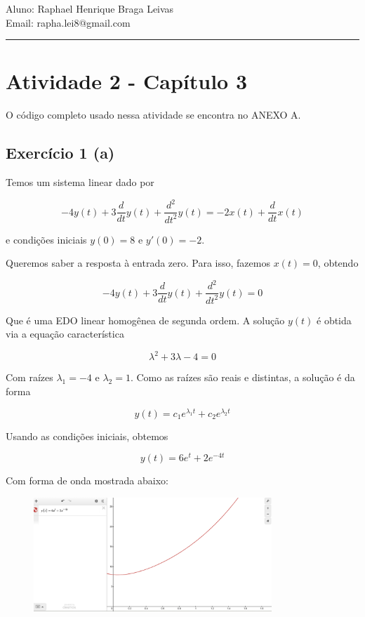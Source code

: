 \documentclass[12pt]{scrartcl}
\makeatletter
\def\today{%
  \two@digits{\the\day}/%
  \ifcase\month\or%
  01\or 02\or 03\or 04\or 05\or 06\or%
  07\or 08\or 09\or 10\or 11\or 12\fi/%
  \number\year%
}
\makeatother
\begin{document}
\pagestyle{fancy}

\fancyhead{}
\fancyhead[R]{Data: \today}
\fancyfoot{}

\begin{center}
    Aluno: Raphael Henrique Braga Leivas \\[20pt]
    Email: rapha.lei8@gmail.com
\end{center}

\hrule

\section*{Atividade 2 - Capítulo 3}

O código completo usado nessa atividade se encontra no ANEXO A.

\subsection*{Exercício 1 (a)}

Temos um sistema linear dado por

\[  - 4 y{\left(t \right)} + 3 \frac{d}{d t} y{\left(t \right)} + \frac{d^{2}}{d t^{2}} y{\left(t \right)} = - 2 x{\left(t \right)} + \frac{d}{d t} x{\left(t \right)} \]

e condições iniciais $y(0) = 8$ e $y'(0) = -2$.

Queremos saber a resposta à entrada zero. Para isso, fazemos $x(t)=0$, obtendo

\[  - 4 y{\left(t \right)} + 3 \frac{d}{d t} y{\left(t \right)} + \frac{d^{2}}{d t^{2}} y{\left(t \right)} =  0 \]

Que é uma EDO linear homogênea de segunda ordem. A solução $y(t)$ é obtida via a equação 
característica

\[ \lambda^{2} + 3 \lambda - 4 = 0 \]

Com raízes $\lambda_1 = -4$ e $\lambda_2 = 1$. Como as raízes são reais e distintas,
a solução é da forma

\[ y(t) = c_1 e^{\lambda_1 t} + c_2 e^{\lambda_2 t} \]

Usando as condições iniciais, obtemos

\[ y(t) = 6 e^{t} + 2 e^{- 4 t} \]

Com forma de onda mostrada abaixo:

\begin{figure}[h!]
	\begin{center}
    \includegraphics[width=0.8\textwidth,trim=1 1 1 1,clip]{ativ2-1a.png}
	\end{center}
\end{figure}
\end{document}

